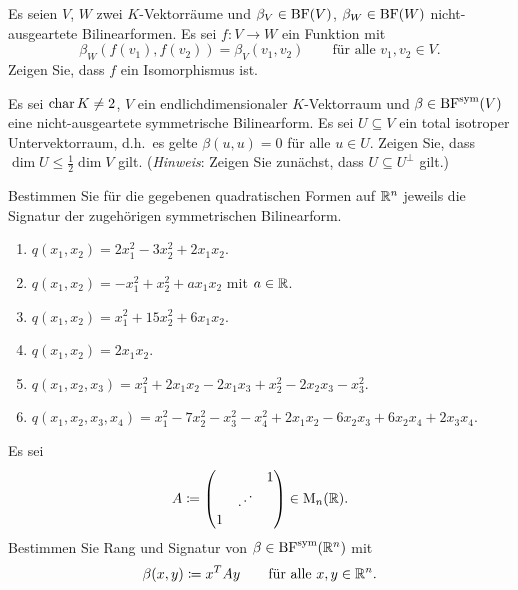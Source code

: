 \documentclass[a4paper, 10pt]{scrartcl}
\begin{document}
\begin{question}
  Es seien $V$, $W$ zwei $K$-Vektorräume und $\beta_V \in \operatorname{BF}(V)$, $\beta_W \in \operatorname{BF}(W)$ nicht-ausgeartete Bilinearformen.
  Es sei $f \colon V \to W$ ein Funktion mit
  \[
      \beta_W( f(v_1), f(v_2) )
    = \beta_V( v_1, v_2 )
    \qquad
    \text{für alle $v_1, v_2 \in V$}.
  \]
  Zeigen Sie, dass $f$ ein Isomorphismus ist.
\end{question}





\begin{question}
  Es sei $\operatorname{char} K \neq 2$, $V$ ein endlichdimensionaler $K$-Vektorraum und $\beta \in \operatorname{BF}^{\operatorname{sym}}(V)$ eine nicht-ausgeartete symmetrische Bilinearform.
  Es sei $U \subseteq V$ ein total isotroper Untervektorraum, d.h.\ es gelte $\beta(u,u) = 0$ für alle $u \in U$.
  Zeigen Sie, dass $\dim U \leq \frac{1}{2} \dim V$ gilt.
  (\emph{Hinweis}:
   Zeigen Sie zunächst, dass $U \subseteq U^\perp$ gilt.)
\end{question}





\begin{question}
  Bestimmen Sie für die gegebenen quadratischen Formen auf $\mathbb{R}^n$ jeweils die Signatur der zugehörigen symmetrischen Bilinearform.
  \begin{enumerate}
    \item
      $q(x_1, x_2) = 2 x_1^2 - 3 x_2^2 + 2 x_1 x_2$.
    \item
      $q(x_1, x_2) = -x_1^2 + x_2^2 + a x_1 x_2$ mit $a \in \mathbb{R}$.
    \item
      $q(x_1, x_2) = x_1^2 + 15 x_2^2 + 6 x_1 x_2$.
    \item
      $q(x_1, x_2) = 2 x_1 x_2$.
    \item
      $q(x_1, x_2, x_3) = x_1^2 + 2 x_1 x_2 - 2 x_1 x_3 + x_2^2 - 2 x_2 x_3 - x_3^2$.
    \item
      $q(x_1, x_2, x_3, x_4) = x_1^2 - 7 x_2^2 - x_3^2 - x_4^2 + 2 x_1 x_2 - 6 x_2 x_3 + 6 x_2 x_4 + 2 x_3 x_4$.
  \end{enumerate}
\end{question}





\begin{question}
  Es sei
  \[
              A
    \coloneqq \begin{pmatrix}
                  &         & 1 \\
                  & \iddots &   \\
                1 &         &
              \end{pmatrix}
    \in \operatorname{M}_{n}(\mathbb{R}).
  \]
  Bestimmen Sie Rang und Signatur von $\beta \in \operatorname{BF}^{\operatorname{sym}}(\mathbb{R}^n)$ mit
  \[
              \beta(x,y)
    \coloneqq x^T A y
    \qquad
    \text{für alle $x, y \in \mathbb{R}^n$}.
  \]
\end{question}
\end{document}
